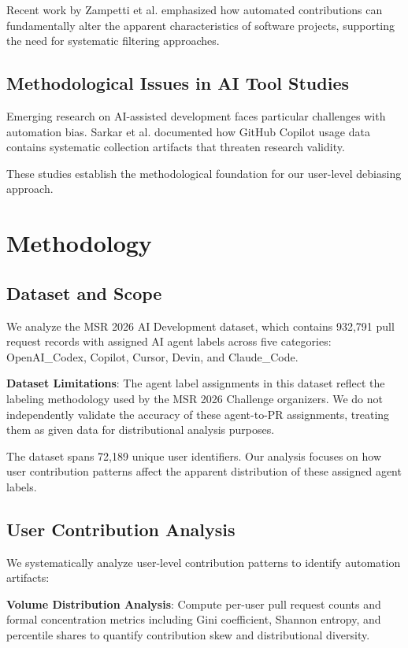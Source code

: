 \documentclass[conference]{IEEEtran}
\begin{document}
Recent work by Zampetti et al. \cite{zampetti2020open} emphasized how automated contributions can fundamentally alter the apparent characteristics of software projects, supporting the need for systematic filtering approaches.

\subsection{Methodological Issues in AI Tool Studies}

Emerging research on AI-assisted development faces particular challenges with automation bias. Sarkar et al. \cite{sarkar2022github} documented how GitHub Copilot usage data contains systematic collection artifacts that threaten research validity.

These studies establish the methodological foundation for our user-level debiasing approach.

\section{Methodology}

\subsection{Dataset and Scope}

We analyze the MSR 2026 AI Development dataset, which contains 932,791 pull request records with assigned AI agent labels across five categories: OpenAI_Codex, Copilot, Cursor, Devin, and Claude_Code. 

\textbf{Dataset Limitations}: The agent label assignments in this dataset reflect the labeling methodology used by the MSR 2026 Challenge organizers. We do not independently validate the accuracy of these agent-to-PR assignments, treating them as given data for distributional analysis purposes.

The dataset spans 72,189 unique user identifiers. Our analysis focuses on how user contribution patterns affect the apparent distribution of these assigned agent labels.

\subsection{User Contribution Analysis}

We systematically analyze user-level contribution patterns to identify automation artifacts:

\textbf{Volume Distribution Analysis}: Compute per-user pull request counts and formal concentration metrics including Gini coefficient, Shannon entropy, and percentile shares to quantify contribution skew and distributional diversity.
\end{document}
